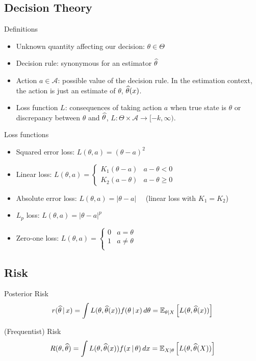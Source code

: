 \documentclass[landscape]{article}
\begin{document}
\begin{multicols*}{2}
\section{Decision Theory}

Definitions
\begin{itemize}
  \item Unknown quantity affecting our decision: $\theta \in \Theta$
  \item Decision rule: synonymous for an estimator $\that$
  \item Action $a \in \mathcal{A}$: possible value of the decision rule. In
    the estimation context, the action is just an estimate of $\theta$,
    $\that(x)$.
  \item Loss function $L$: consequences of taking action $a$ when true state
    is $\theta$ or discrepancy between $\theta$ and $\that$,
    $L: \Theta \times \mathcal{A} \to [-k,\infty).$
\end{itemize}

Loss functions
\begin{itemize}
  \item Squared error loss: $L(\theta,a) = (\theta-a)^2$
  \item Linear loss: $L(\theta,a) = \begin{cases}
      K_1(\theta-a) & a-\theta < 0 \\
      K_2(a-\theta) & a-\theta \ge 0
    \end{cases}$
  \item Absolute error loss: $L(\theta,a) = |\theta-a| \quad$ 
    (linear loss with $K_1=K_2$)
  \item $L_p$ loss: $L(\theta,a) = |\theta-a|^p$
  \item Zero-one loss: $L(\theta,a) = \begin{cases}
      0 & a=\theta \\
      1 & a\neq\theta \\
    \end{cases}$
\end{itemize}

\subsection{Risk}

Posterior Risk
$$r(\that \giv x)
= \int L(\theta,\that(x))f(\theta\giv x)\,d\theta
= \E[\theta|X]{L(\theta,\that(x))}$$

(Frequentist) Risk
$$R(\theta,\that) 
= \int L(\theta,\that(x)) f(x\giv\theta) \dx
= \E[X|\theta]{L(\theta,\that(X))}$$


\end{multicols*}
\end{document}
